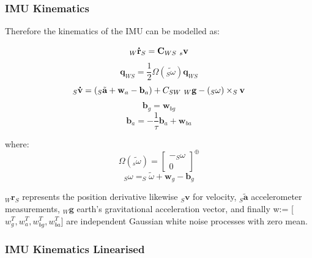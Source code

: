 \documentclass[11pt,twoside]{report}
\begin{document}
\subsubsection{IMU Kinematics}

Therefore the kinematics of the IMU can be modelled as:

\begin{equation}
\label{imu_kin}
_{W} \textbf{\.{r}}_{S} = \textbf{C}_{WS} \textnormal{ } _{s}\textbf{v}
\end{equation}
\begin{equation}
\textbf{\.{q}}_{WS} = \frac{1}{2} \Omega(\tilde{_{S}\textbf{$\omega$}})\textbf{q}_{WS}
\end{equation}
\begin{equation}
_{S}\textbf{\.{v}}= (_{S}\tilde{\textbf{a}} + \textbf{w}_{a} - \textbf{b}_{a}) + C_{SW} \textnormal{ } _{W}\textbf{g} - (_{S}\textbf{$\omega$}) \times _{S}\textbf{v}
\end{equation}
\begin{equation}
\textbf{\.{b}}_{g} = \textbf{w}_{bg}
\end{equation}
\begin{equation}
\textbf{\.{b}}_{a} = -\frac{1}{\tau}\textbf{b}_{a} + \textbf{w}_{ba}
\end{equation}

where:
\begin{equation}
\Omega(\tilde{_{s}\textbf{$\omega$}}) = \begin{bmatrix}
-_{S}\textbf{$\omega$}  \\[0.3em]
0
\end{bmatrix} ^{\oplus}
\end{equation}
\begin{equation}
_{S}\textbf{$\omega$} =  _{S}\tilde{\textbf{$\omega$}} + \textbf{w}_{g} - \textbf{b}_{g}
\end{equation}

$_{W} \textbf{\.{r}}_{S}$ represents the position derivative likewise $_{S}\textbf{\.{v}}$ for velocity,  $_{S}\tilde{\textbf{a}}$ accelerometer measurements, $_{W}\textbf{g}$ earth's gravitational acceleration vector, and finally w:= [$w_{g}^{T},w_{a}^{T},w_{bg}^{T},w_{ba}^{T}$] are independent Gaussian white noise processes with zero mean.

\subsubsection{IMU Kinematics Linearised}
\end{document}
